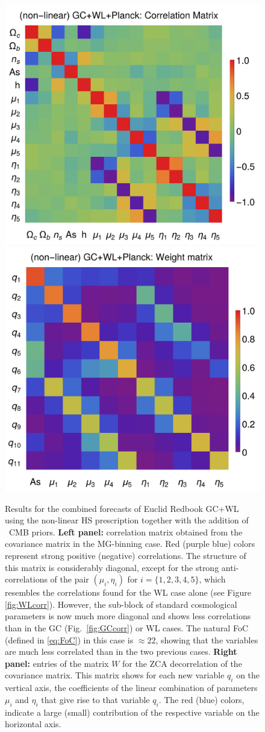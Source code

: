 \begin{figure}[htbp]
	\centering
    \includegraphics[width=0.4\linewidth]{Chapters/linear-nonlinear-MG-forecasts/figures/Decorrelations-GC+WL+Planck/correlation-full-fiducialMGBin3-Euclid-GC+WL+Planck-nonlinearPk__Zhao-}
    \includegraphics[width=0.4\linewidth]{Chapters/linear-nonlinear-MG-forecasts/figures/Decorrelations-GC+WL+Planck/Weight_Matrix_ZCA_SquareNorm--_fiducialMGBin3_Euclid_GC+WL+Planck_nonlinearPk__Zhao_}
	\caption[Correlation and Weight matrix for a Euclid GC+WL forecast.]{\label{fig:GC+WL+Planck-corr-Wmat}
Results for the combined forecasts of Euclid Redbook GC+WL using the non-linear HS prescription together with the addition 
of \planck\ CMB priors.
\textbf{Left panel:} correlation matrix obtained from the covariance matrix in the MG-binning case. 
Red (purple blue) colors represent strong positive (negative) correlations. 
The structure of this matrix is considerably diagonal, except for the strong anti-correlations of the pair $(\mu_i,\eta_i)$ 
for $i=\{1,2,3,4,5\}$, which resembles the correlations found for the WL case alone (see Figure \ref{fig:WLcorr}). 
However, the sub-block of standard cosmological parameters is now  much more diagonal 
and shows less correlations than in the GC (Fig.\ \ref{fig:GCcorr}) or WL cases.
The natural FoC (defined in \ref{eq:FoC}) in this case is $\approx 22$, showing that the variables are much less correlated 
than in the two previous cases.
\textbf{Right panel:} entries of the matrix $W$ for the ZCA decorrelation of the covariance matrix. 
This matrix shows for each new variable $q_i$ on the vertical axis, the coefficients of the 
linear combination of parameters $\mu_i$ and $\eta_i$ that give rise to that variable $q_i$. 
The red (blue) colors, indicate a large (small) contribution of the respective variable on the horizontal axis.}
\end{figure}


